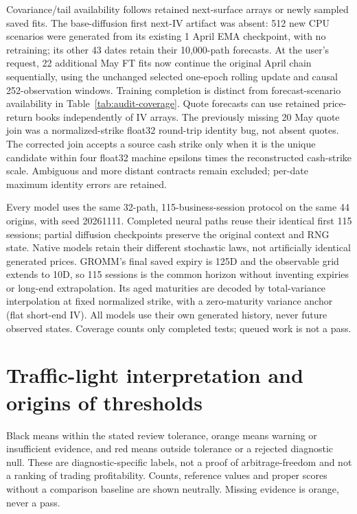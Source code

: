 \documentclass[11pt]{article}
\begin{document}
Covariance/tail availability follows retained next-surface arrays or newly sampled saved fits. The base-diffusion first next-IV artifact was absent: 512 new CPU scenarios were generated from its existing 1 April EMA checkpoint, with no retraining; its other 43 dates retain their 10,000-path forecasts. At the user's request, 22 additional May FT fits now continue the original April chain sequentially, using the unchanged selected one-epoch rolling update and causal 252-observation windows. Training completion is distinct from forecast-scenario availability in Table~\ref{tab:audit-coverage}. Quote forecasts can use retained price-return books independently of IV arrays. The previously missing 20 May quote join was a normalized-strike float32 round-trip identity bug, not absent quotes. The corrected join accepts a source cash strike only when it is the unique candidate within four float32 machine epsilons times the reconstructed cash-strike scale. Ambiguous and more distant contracts remain excluded; per-date maximum identity errors are retained.

Every model uses the same 32-path, 115-business-session protocol on the same 44 origins, with seed 20261111. Completed neural paths reuse their identical first 115 sessions; partial diffusion checkpoints preserve the original context and RNG state. Native models retain their different stochastic laws, not artificially identical generated prices. GROMM's final saved expiry is 125D and the observable grid extends to 10D, so 115 sessions is the common horizon without inventing expiries or long-end extrapolation. Its aged maturities are decoded by total-variance interpolation at fixed normalized strike, with a zero-maturity variance anchor (flat short-end IV). All models use their own generated history, never future observed states. Coverage counts only completed tests; queued work is not a pass.

\section{Traffic-light interpretation and origins of thresholds}

Black means within the stated review tolerance, orange means warning or insufficient evidence, and red means outside tolerance or a rejected diagnostic null. These are diagnostic-specific labels, not a proof of arbitrage-freedom and not a ranking of trading profitability. Counts, reference values and proper scores without a comparison baseline are shown neutrally. Missing evidence is orange, never a pass.
\end{document}
